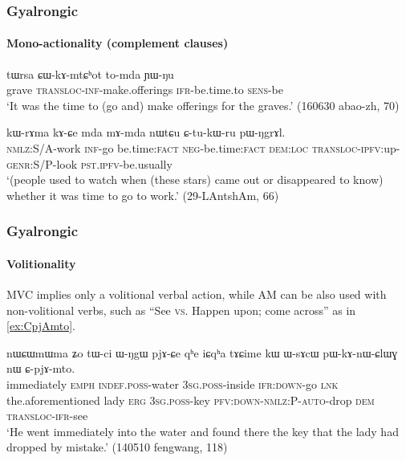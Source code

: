 \documentclass[xcolor=table]{beamer}
\newcommand{\bleu}[1]{{\color{blue}#1}}
\newcommand{\rouge}[1]{{\color{red}#1}}
\newcommand{\quo}[1]{“#1”}
\begin{document}
  \begin{frame} 
\frametitle{Gyalrongic}
 \framesubtitle{Mono-actionality (complement clauses)}
\begin{exe}
\ex \label{ex:CWkAmtChot}
\gll tɯrsa \rouge{ɕɯ}-kɤ-mtɕʰot to-mda ɲɯ-ŋu \\
grave \rouge{\textsc{transloc}}-\textsc{inf}-make.offerings \textsc{ifr}-be.time.to \textsc{sens}-be \\
\glt `It was the time to (\rouge{go} and) make offerings for the graves.' (160630 abao-zh, 70)
 \end{exe} 

 \begin{exe}
\ex \label{ex:kWrAma.kACe}
\gll   kɯ-rɤma kɤ-\bleu{ɕe} mda mɤ-mda nɯtɕu ɕ-tu-kɯ-ru pɯ-ŋgrɤl. \\
 \textsc{nmlz}:S/A-work \textsc{inf}-\bleu{go} be.time:\textsc{fact} \textsc{neg}-be.time:\textsc{fact} \textsc{dem}:\textsc{loc} \textsc{transloc}-\textsc{ipfv}:up-\textsc{genr}:S/P-look \textsc{pst}.\textsc{ipfv}-be.usually \\
 \glt  `(people used to watch when (these stars) came out or disappeared to know) whether it was time to \bleu{go} to work.' (29-LAntshAm, 66)
  \end{exe}
    \end{frame}  
    \begin{frame} 
    
    
\frametitle{Gyalrongic}
 \framesubtitle{Volitionality}
MVC implies only a volitional verbal action, while AM can be also used with non-volitional verbs, such as \quo{See \textsc{vs.} Happen upon; come across}  as in \ref{ex:CpjAmto}.

  \begin{exe}
\ex  \label{ex:CpjAmto}
\gll  nɯɕɯmɯma ʑo tɯ-ci ɯ-ŋgɯ pjɤ-\bleu{ɕe} qʰe iɕqʰa tɤɕime kɯ ɯ-sɤcɯ pɯ-kɤ-nɯ-ɕlɯɣ nɯ \rouge{ɕ}-pjɤ-mto. \\
immediately \textsc{emph} \textsc{indef}.\textsc{poss}-water \textsc{3sg}.\textsc{poss}-inside \textsc{ifr}:\textsc{down}-go \textsc{lnk} the.aforementioned lady \textsc{erg} \textsc{3sg}.\textsc{poss}-key \textsc{pfv}:\textsc{down}-\textsc{nmlz}:P-\textsc{auto}-drop \textsc{dem} \rouge{\textsc{transloc}}-\textsc{ifr}-see \\
\glt `He \bleu{went} immediately into the water and \rouge{found there} the key that the lady had dropped by mistake.' (140510 fengwang, 118)
\end{exe}
  \end{frame}  
  
\end{document}

